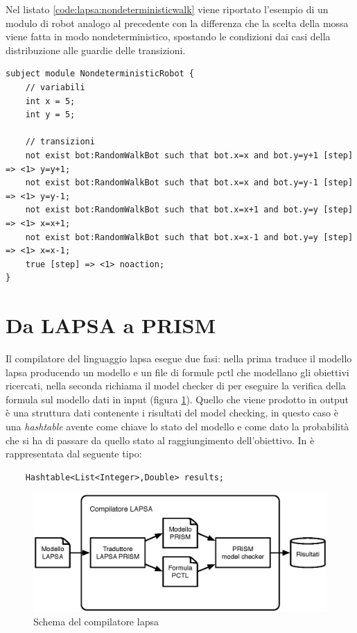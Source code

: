 Nel listato \ref{code:lapsa:nondeterministicwalk} viene riportato l'esempio di un modulo di robot analogo al precedente con la differenza che la scelta della mossa viene fatta in modo nondeterministico, spostando le condizioni dai casi della distribuzione alle guardie delle transizioni.

\begin{lstlisting}[language=lapsa,style=eclipse,caption={Versione nondeterministica della random walk in \ac{lapsa}},label=code:lapsa:nondeterministicwalk]
subject module NondeterministicRobot {
	// variabili
	int x = 5;
	int y = 5;
	
	// transizioni
	not exist bot:RandomWalkBot such that bot.x=x and bot.y=y+1 [step] => <1> y=y+1;
	not exist bot:RandomWalkBot such that bot.x=x and bot.y=y-1 [step] => <1> y=y-1;
	not exist bot:RandomWalkBot such that bot.x=x+1 and bot.y=y [step] => <1> x=x+1;
	not exist bot:RandomWalkBot such that bot.x=x-1 and bot.y=y [step] => <1> x=x-1;
	true [step] => <1> noaction;
}
\end{lstlisting}

\section{Da LAPSA a PRISM}
Il compilatore del linguaggio \ac{lapsa} esegue due fasi: nella prima traduce il modello \ac{lapsa} producendo un modello \prism{} e un file di formule \ac{pctl} che modellano gli obiettivi ricercati, nella seconda richiama il model checker di \prism{} per eseguire la verifica della formula sul modello dati in input (figura \ref{fig:lapsa:compiler}). Quello che viene prodotto in output è una struttura dati contenente i risultati del model checking, in questo caso è una \emph{hashtable} avente come chiave lo stato del modello e come dato la probabilità che si ha di passare da quello stato al raggiungimento dell'obiettivo. In \java{} è rappresentata dal seguente tipo:
\begin{verbatim}
	Hashtable<List<Integer>,Double> results;
\end{verbatim}

\begin{figure}[htbp!]
	\begin{centering}
		\includegraphics[width=\textwidth]{Images/lapsa}
	\end{centering}
	\caption{Schema del compilatore \ac{lapsa}}
	\label{fig:lapsa:compiler}
\end{figure}

